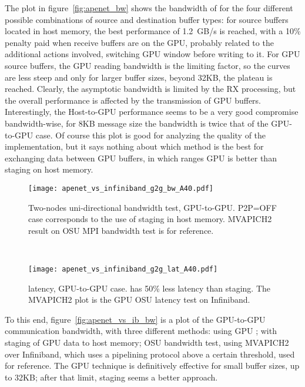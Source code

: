 The plot in figure~\ref{fig:apenet_bw} shows the bandwidth of \apenetp
for the four different possible combinations of source and destination
buffer types:
for source buffers located in host memory, the best performance of
1.2~GB/s is reached, with a 10\% penalty paid when receive buffers are
on the GPU, probably related to the additional actions involved, \ie
switching GPU \PtoP window before writing to it.
For GPU source buffers, the GPU \PtoP reading bandwidth is the
limiting factor, so the curves are less steep and only for larger
buffer sizes, \ie beyond 32KB, the plateau is reached.
Clearly, the asymptotic bandwidth is limited by the RX processing, but
the overall performance is affected by the transmission of GPU
buffers.
Interestingly, the Host-to-GPU performance seems to be a very good
compromise bandwidth-wise, \eg for 8KB message size the bandwidth is
twice that of the GPU-to-GPU case.
Of course this plot is good for analyzing the quality of the \apenetp
implementation, but it says nothing about which method is the best for
exchanging data between GPU buffers, \ie in which ranges GPU \PtoP is
better than staging on host memory.

\begin{figure}[t]
 \begin{minipage}[t]{0.48\textwidth}
   \centering
   \texttt{[image: apenet\_vs\_infiniband\_g2g\_bw\_A40.pdf]}
   \caption{\mbox{Two-nodes} \mbox{uni-directional} bandwidth test,
  GPU-to-GPU. P2P=OFF case corresponds to the use of staging in host
  memory. MVAPICH2 result on OSU MPI bandwidth test is for reference.}
   \label{fig:apenet_vs_ib_bw}
 \end{minipage}
 \ \hspace{2mm} \hspace{3mm} \
 \begin{minipage}[t]{0.48\textwidth}
 \centering
\texttt{[image: apenet\_vs\_infiniband\_g2g\_lat\_A40.pdf]}
\caption{\apenetp latency, GPU-to-GPU case. \PtoP has 50\% less
  latency than staging. The MVAPICH2 plot is the GPU OSU latency test
  on Infiniband.}
\label{fig:apenet_vs_ib_lat}
 \end{minipage}
\end{figure}


To this end, figure~\ref{fig:apenet_vs_ib_bw} is a plot of the
GPU-to-GPU communication bandwidth, with three different methods:
\apenetp using GPU \PtoP; \apenetp with staging of GPU data to host
memory; OSU bandwidth test, using MVAPICH2~\cite{MVAPICH2} over
Infiniband, which uses a pipelining protocol above a certain
threshold, used for reference.
The GPU \PtoP technique is definitively effective for small buffer
sizes, \ie up to 32KB; after that limit, staging seems a better
approach.


